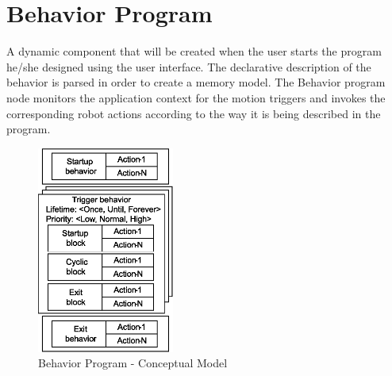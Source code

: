 \section{Behavior Program} 
\label{ssec:behavior_program}
A dynamic component that will be created when the user starts the program he/she designed using the user interface. The declarative description of the behavior is parsed in order to create a memory model. The Behavior program node monitors the application context for the motion triggers and invokes the corresponding robot actions according to the way it is being described in the program.
\begin{figure}
\centering
\includegraphics[width=0.4\textwidth]{../thesis/assets/program_structure.eps}
\caption[Behavior Program - Conceptual Model]{Behavior Program - Conceptual Model}
\label{fig:program_concept}
\end{figure}
